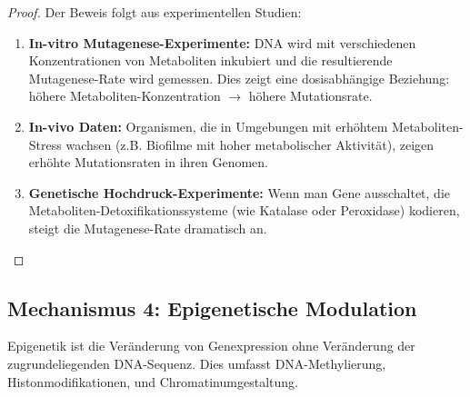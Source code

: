 \documentclass[a4paper,12pt]{article}
\theoremstyle{definition}
\begin{document}
\begin{proof}
Der Beweis folgt aus experimentellen Studien:

\begin{enumerate}
    \item \textbf{In-vitro Mutagenese-Experimente:} DNA wird mit verschiedenen Konzentrationen von Metaboliten inkubiert und die resultierende Mutagenese-Rate wird gemessen. Dies zeigt eine dosisabhängige Beziehung: höhere Metaboliten-Konzentration $\to$ höhere Mutationsrate.
    
    \item \textbf{In-vivo Daten:} Organismen, die in Umgebungen mit erhöhtem Metaboliten-Stress wachsen (z.B. Biofilme mit hoher metabolischer Aktivität), zeigen erhöhte Mutationsraten in ihren Genomen.
    
    \item \textbf{Genetische Hochdruck-Experimente:} Wenn man Gene ausschaltet, die Metaboliten-Detoxifikationssysteme (wie Katalase oder Peroxidase) kodieren, steigt die Mutagenese-Rate dramatisch an.
\end{enumerate}
\end{proof}

\subsection{Mechanismus 4: Epigenetische Modulation}

Epigenetik ist die Veränderung von Genexpression ohne Veränderung der zugrundeliegenden DNA-Sequenz. Dies umfasst DNA-Methylierung, Histonmodifikationen, und Chromatinumgestaltung.
\end{document}
